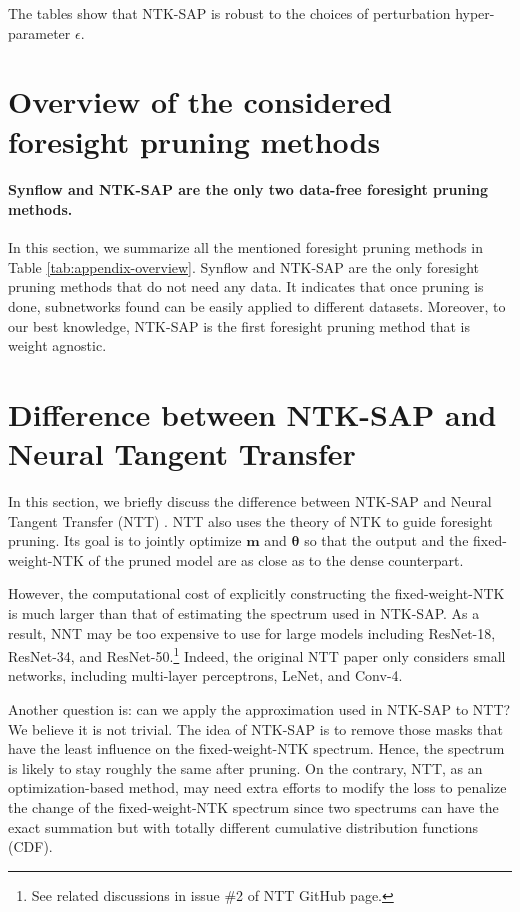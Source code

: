 \documentclass{article} %
\begin{document}
The tables show that NTK-SAP is robust to the choices of perturbation hyper-parameter $\epsilon$.


\section{Overview of the considered foresight pruning methods} \label{sect:overview}


\paragraph{Synflow and NTK-SAP are the only two data-free foresight pruning methods.} In this section, we summarize all the mentioned foresight pruning methods in Table \ref{tab:appendix-overview}. Synflow and NTK-SAP are the only foresight pruning methods that do not need any data. It indicates that once pruning is done, subnetworks found can be easily applied to different datasets. Moreover, to our best knowledge, NTK-SAP is the first foresight pruning method that is weight agnostic.

\section{Difference between NTK-SAP and Neural Tangent Transfer} \label{sect:compare-NTT}

In this section, we briefly discuss the difference between NTK-SAP and Neural Tangent Transfer (NTT) \citep{NTT}. NTT also uses the theory of NTK to guide foresight pruning. Its goal is to jointly optimize $\mathbf{m}$ and $\boldsymbol{\theta}$ so that the output and the fixed-weight-NTK of the pruned model are as close as to the dense counterpart. 

However, the computational cost of explicitly constructing the fixed-weight-NTK is much larger than that of estimating the spectrum
used in NTK-SAP. 
As a result, NNT may be too expensive to use for large models
 including ResNet-18, ResNet-34, and ResNet-50.\footnote{See related discussions in issue $\#$2 of NTT GitHub page.}
Indeed, the original NTT paper only considers small networks, including multi-layer perceptrons, LeNet, and Conv-4. 



Another question is: can we apply the approximation used in NTK-SAP to NTT? We believe it is not trivial. The idea of NTK-SAP is to remove those masks that have the least influence on the fixed-weight-NTK spectrum. Hence, the spectrum is likely to stay roughly the same after pruning. On the contrary, NTT, as an optimization-based method, may need extra efforts to modify the loss to penalize the change of the fixed-weight-NTK spectrum since two spectrums can have the exact summation but with totally different cumulative distribution functions (CDF).
\end{document}
